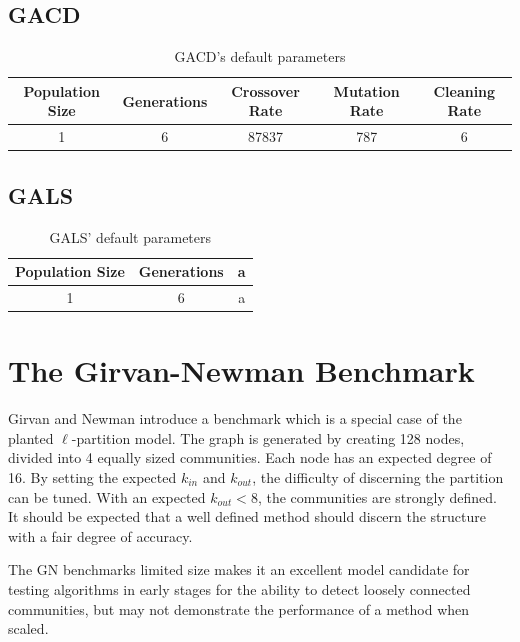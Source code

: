 \subsection{GACD}
\cite{Shi2009}
\begin{table}[h!]
	\centering
	\begin{tabular}{| c | c | c | c | c |}
		\hline
		Population Size & Generations & Crossover Rate & Mutation Rate  & Cleaning Rate \\ [0.5ex] 
		\hline
		1 & 6 & 87837 & 787 & 6  \\ 
		
		\hline
	\end{tabular}
	\caption{GACD's default parameters}
	\label{table:1}
\end{table}


\subsection{GALS}
\cite{liu2013genetic}
\begin{table}[h!]
	\centering
	\begin{tabular}{| c | c | c |}
		\hline
		Population Size & Generations  & a \\ [0.5ex] 
		\hline
		1 & 6 & a \\ 
		
		\hline
	\end{tabular}
	\caption{GALS' default parameters}
	\label{table:1}
\end{table}


\section{The Girvan-Newman Benchmark}

Girvan and Newman introduce a benchmark which is a special case of the planted $\ell$-partition model\cite{Girvan2002}. The graph is generated by creating 128 nodes, divided into 4 equally sized communities. Each node has an expected degree of 16. By setting the expected $k_{in}$ and $k_{out}$, the difficulty of discerning the partition can be tuned. With an expected $k_{out} < 8$, the communities are strongly defined. It should be expected that a well defined method should discern the structure with a fair degree of accuracy. 

The GN benchmarks limited size makes it an excellent model candidate for testing algorithms in early stages for the ability to detect loosely connected communities, but may not demonstrate the performance of a method when scaled\cite{Yang2016}.


